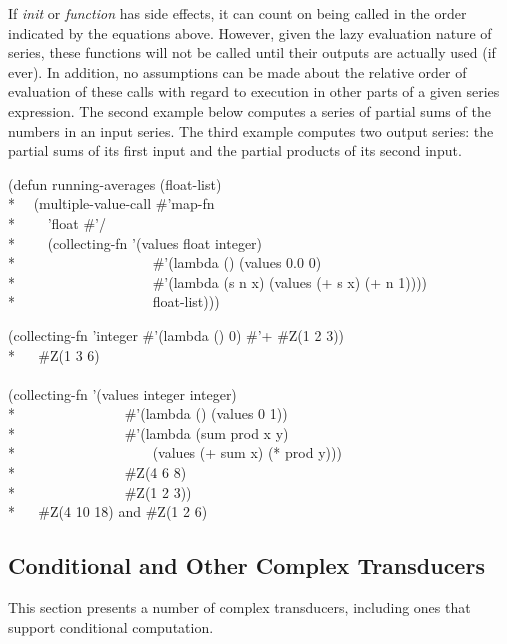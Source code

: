 \begin{defun}[Function]
If \emph{init} or \emph{function} has side effects, it can count on
being called in the order indicated by the equations above.  However,
given the lazy evaluation nature of series, these functions will not be called
until their outputs are actually used (if ever).  In addition, no
assumptions can be made about the relative order of evaluation of these
calls with regard to execution in other parts of a given series expression.
The second example below computes a series of partial sums of the numbers in
an input series.  The third example computes two output series: the
partial sums of its first input and the partial products of its second
input.
\begin{lisp}
(defun running-averages (float-list) \\*
~~(multiple-value-call \#'map-fn \\*
~~~~'float \#'/ \\*
~~~~(collecting-fn '(values float integer) \\*
~~~~~~~~~~~~~~~~~~~\#'(lambda () (values 0.0 0) \\*
~~~~~~~~~~~~~~~~~~~\#'(lambda (s n x) (values (+ s x) (+ n 1)))) \\*
~~~~~~~~~~~~~~~~~~~float-list)))
\end{lisp}
\begin{lisp}
(collecting-fn 'integer \#'(lambda () 0) \#'+ \#Z(1 2 3)) \\*
~~{\EV} \#Z(1 3 6) \\
\\
(collecting-fn '(values integer integer) \\*
~~~~~~~~~~~~~~~\#'(lambda () (values 0 1)) \\*
~~~~~~~~~~~~~~~\#'(lambda (sum prod x y) \\*
~~~~~~~~~~~~~~~~~~~(values (+ sum x) (* prod y))) \\*
~~~~~~~~~~~~~~~\#Z(4 6 8)  \\*
~~~~~~~~~~~~~~~\#Z(1 2 3)) \\*
~~{\EV} \#Z(4 10 18) {\rm and} \#Z(1 2 6)
\end{lisp}
\end{defun}

\subsection{Conditional and Other Complex Transducers}
\label{SERIES-OL-SECTION}

This section presents a number of complex transducers, including ones that
support conditional computation.


